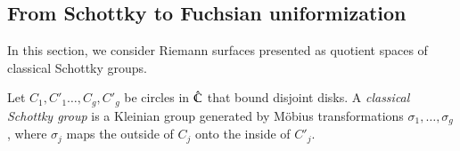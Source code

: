 \documentclass[Thesis]{subfiles}
\begin{document}






\subsection{From Schottky to Fuchsian uniformization}
\label{sec:schottky}

In this section, we consider Riemann surfaces presented as quotient
spaces of classical Schottky groups.

\begin{definition} Let $C_1,C'_1\ldots,C_g,C'_g$ be circles in
  $\hat{\mathbb C}$ that bound disjoint disks. A \emph{classical Schottky
    group} is a Kleinian group generated by M{\"o}bius transformations
  $\sigma_1,\ldots,\sigma_g$,
  where $\sigma_j$ maps the outside of $C_j$ onto the inside of $C'_j$.
\end{definition}
\end{document}
